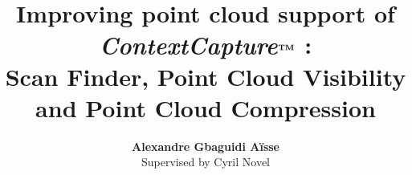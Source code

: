 \documentclass[a4paper,11pt,twoside]{report}
\newcommand{\CC }{\emph{ContextCapture$^{\text{\textbf{TM}}}$ }}
\begin{document}
\title{\LARGE {\bf Improving point cloud support of \CC:\\Scan Finder, Point Cloud Visibility and Point Cloud Compression}\\
 \vspace*{6mm}
}

\author{{\bf Alexandre Gbaguidi A\"isse}\\\vspace{3cm}Supervised by Cyril Novel}

\normallinespacing
\maketitle

\preface




\body









\appendix




\end{document}
